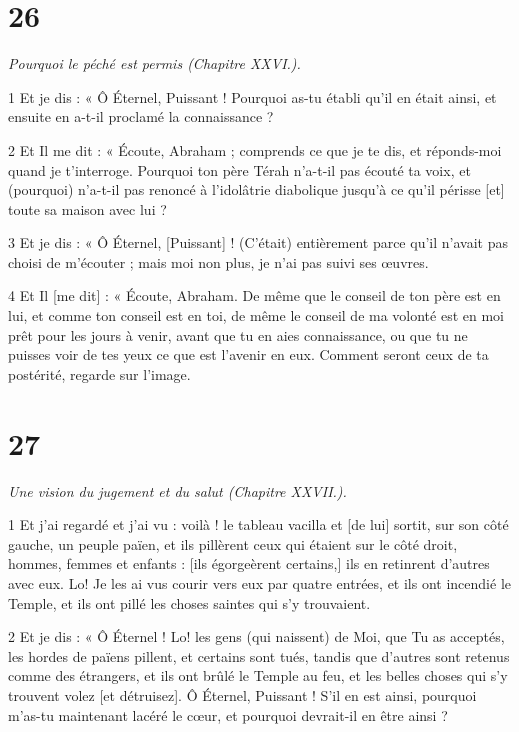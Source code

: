 \chapter{26}

\par \textit{Pourquoi le péché est permis (Chapitre XXVI.).}

\par 1 Et je dis : « Ô Éternel, Puissant ! Pourquoi as-tu établi qu’il en était ainsi, et ensuite en a-t-il proclamé la connaissance ?

\par 2 Et Il me dit : « Écoute, Abraham ; comprends ce que je te dis, et réponds-moi quand je t'interroge. Pourquoi ton père Térah n'a-t-il pas écouté ta voix, et (pourquoi) n'a-t-il pas renoncé à l'idolâtrie diabolique jusqu'à ce qu'il périsse [et] toute sa maison avec lui ?

\par 3 Et je dis : « Ô Éternel, [Puissant] ! (C'était) entièrement parce qu'il n'avait pas choisi de m'écouter ; mais moi non plus, je n’ai pas suivi ses œuvres.

\par 4 Et Il [me dit] : « Écoute, Abraham. De même que le conseil de ton père est en lui, et comme ton conseil est en toi, de même le conseil de ma volonté est en moi prêt pour les jours à venir, avant que tu en aies connaissance, ou que tu ne puisses voir de tes yeux ce que est l'avenir en eux. Comment seront ceux de ta postérité, regarde sur l’image.

\chapter{27}

\par \textit{Une vision du jugement et du salut (Chapitre XXVII.).}

\par 1 Et j'ai regardé et j'ai vu : voilà ! le tableau vacilla et [de lui] sortit, sur son côté gauche, un peuple païen, et ils pillèrent ceux qui étaient sur le côté droit, hommes, femmes et enfants : [ils égorgeèrent certains,] ils en retinrent d'autres avec eux. Lo! Je les ai vus courir vers eux par quatre entrées, et ils ont incendié le Temple, et ils ont pillé les choses saintes qui s'y trouvaient.

\par 2 Et je dis : « Ô Éternel ! Lo! les gens (qui naissent) de Moi, que Tu as acceptés, les hordes de païens pillent, et certains sont tués, tandis que d'autres sont retenus comme des étrangers, et ils ont brûlé le Temple au feu, et les belles choses qui s'y trouvent volez [et détruisez]. Ô Éternel, Puissant ! S’il en est ainsi, pourquoi m’as-tu maintenant lacéré le cœur, et pourquoi devrait-il en être ainsi ?

